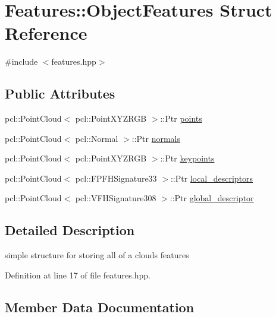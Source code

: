 \hypertarget{struct_features_1_1_object_features}{}\section{Features\+:\+:Object\+Features Struct Reference}
\label{struct_features_1_1_object_features}


{\ttfamily \#include $<$features.\+hpp$>$}

\subsection*{Public Attributes}
\begin{DoxyCompactItemize}
\item 
pcl\+::\+Point\+Cloud$<$ pcl\+::\+Point\+X\+Y\+Z\+R\+GB $>$\+::Ptr \hyperlink{struct_features_1_1_object_features_a86f25004593f4c99fd1bbcd3f0d7cf62}{points}
\item 
pcl\+::\+Point\+Cloud$<$ pcl\+::\+Normal $>$\+::Ptr \hyperlink{struct_features_1_1_object_features_ad0d958cfd324196e673ace91e4f57a94}{normals}
\item 
pcl\+::\+Point\+Cloud$<$ pcl\+::\+Point\+X\+Y\+Z\+R\+GB $>$\+::Ptr \hyperlink{struct_features_1_1_object_features_a1d79b5b8a3ed32e75e3bb31bf90e1f27}{keypoints}
\item 
pcl\+::\+Point\+Cloud$<$ pcl\+::\+F\+P\+F\+H\+Signature33 $>$\+::Ptr \hyperlink{struct_features_1_1_object_features_a6a0716472128159b45153c96404ad8c4}{local\+\_\+descriptors}
\item 
pcl\+::\+Point\+Cloud$<$ pcl\+::\+V\+F\+H\+Signature308 $>$\+::Ptr \hyperlink{struct_features_1_1_object_features_a548f1777bc3e5eb3be4c3c3378ac467f}{global\+\_\+descriptor}
\end{DoxyCompactItemize}


\subsection{Detailed Description}
simple structure for storing all of a cloud\textquotesingle{}s features 

Definition at line 17 of file features.\+hpp.



\subsection{Member Data Documentation}
\hypertarget{struct_features_1_1_object_features_a548f1777bc3e5eb3be4c3c3378ac467f}{}\label{struct_features_1_1_object_features_a548f1777bc3e5eb3be4c3c3378ac467f} 
